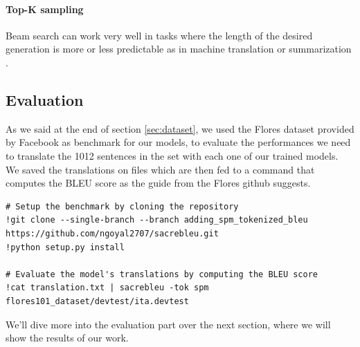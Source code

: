 \paragraph{Top-K sampling}
Beam search can work very well in tasks where the length of the desired generation is more or less predictable as in machine translation or summarization \citet{yang2018breaking}. 


\subsection{Evaluation}
As we said at the end of section \ref{sec:dataset}, we used the Flores dataset \cite{goyal2021flores} provided by Facebook as benchmark for our models, to evaluate the performances we need to translate the 1012 sentences in the set with each one of our trained models. We saved the translations on files which are then fed to a command that computes the BLEU score as the guide from the Flores github suggests.
\begin{verbatim}
# Setup the benchmark by cloning the repository
!git clone --single-branch --branch adding_spm_tokenized_bleu https://github.com/ngoyal2707/sacrebleu.git
!python setup.py install

# Evaluate the model's translations by computing the BLEU score
!cat translation.txt | sacrebleu -tok spm flores101_dataset/devtest/ita.devtest
\end{verbatim}
We'll dive more into the evaluation part over the next section, where we will show the results of our work.